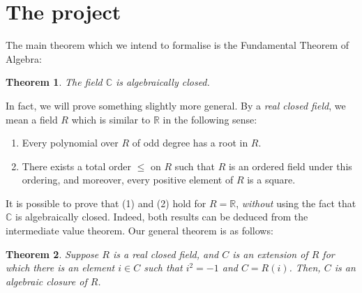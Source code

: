 \documentclass{article}
\newtheorem{theorem}{Theorem}
\begin{document}
\section*{The project}

The main theorem which we intend to formalise is the Fundamental Theorem of Algebra:
\begin{theorem}\label{thm:fta}
The field $\mathbb C$ is algebraically closed.
\end{theorem}
In fact, we will prove something slightly more general. By a \emph{real closed field}, we mean a field $R$ which is similar to $\mathbb R$ in the following sense:
\begin{enumerate}[label=(\arabic*)]
\item Every polynomial over $R$ of odd degree has a root in $R$.
\item There exists a total order $\le$ on $R$ such that $R$ is an ordered field under this ordering, and moreover, every positive element of $R$ is a square.
\end{enumerate}
It is possible to prove that (1) and (2) hold for $R=\mathbb R$, \emph{without} using the fact that $\mathbb C$ is algebraically closed. Indeed, both results can be deduced from the intermediate value theorem. Our general theorem is as follows:
\begin{theorem}\label{thm:general}
Suppose $R$ is a real closed field, and $C$ is an extension of $R$ for which there is an element $i\in C$ such that $i^2=-1$ and $C=R(i)$. Then, $C$ is an algebraic closure of $R$.
\end{theorem}
\end{document}
